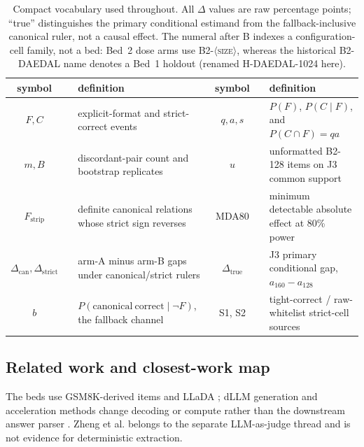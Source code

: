 \documentclass{article}
\begin{document}
\begin{table}[!tb]
\centering\footnotesize
\setlength{\tabcolsep}{2pt}
\begin{tabular}{@{}cl>{\raggedright\arraybackslash}p{4.95cm}%
                    cl>{\raggedright\arraybackslash}p{4.95cm}@{}}
\toprule
symbol & & definition & symbol & & definition \\
\midrule
$F,C$ && explicit-format and strict-correct events & $q,a,s$ && $P(F)$, $P(C\mid F)$, and $P(C\cap F)=qa$ \\
$m,B$ && discordant-pair count and bootstrap replicates & $u$ && unformatted B2-128 items on J3 common support \\
$F_{\mathrm{strip}}$ && definite canonical relations whose strict sign reverses & MDA80 && minimum detectable absolute effect at 80\% power \\
$\Delta_{\mathrm{can}},\Delta_{\mathrm{strict}}$ && arm-A minus arm-B gaps under canonical/strict rulers & $\Delta_{\mathrm{true}}$ && J3 primary conditional gap, $a_{160}-a_{128}$ \\
$b$ && $P(\mathrm{canonical\ correct}\mid\neg F)$, the fallback channel & S1, S2 && tight-correct / raw-whitelist strict-cell sources \\
\bottomrule
\end{tabular}
\caption{Compact vocabulary used throughout.  All $\Delta$ values are raw
percentage points; ``true'' distinguishes the primary conditional estimand
from the fallback-inclusive canonical ruler, not a causal effect.  The numeral
after B indexes a configuration-cell family, not a bed: Bed~2 dose arms use
\textsc{B2-$\langle$size$\rangle$}, whereas the historical
\textsc{B2-DAEDAL} name denotes a Bed~1 holdout (renamed
\textsc{H-DAEDAL-1024} here).}
\label{tab:vocabulary}
\end{table}

\subsection{Related work and closest-work map}
\label{sec:related}

The beds use GSM8K-derived items \citep{cobbe2021gsm8k} and LLaDA
\citep{nie2025llada}; dLLM generation and acceleration methods change decoding
or compute rather than the downstream answer parser
\citep{zhou2026dllm,ye2025dream,li2025daedal,wu2026dreamon,wu2025fastdllm,wu2025fastdllmv2}.
Zheng et al. \citep{zheng2023judging} belongs to the separate LLM-as-judge
thread and is not evidence for deterministic extraction.
\end{document}
